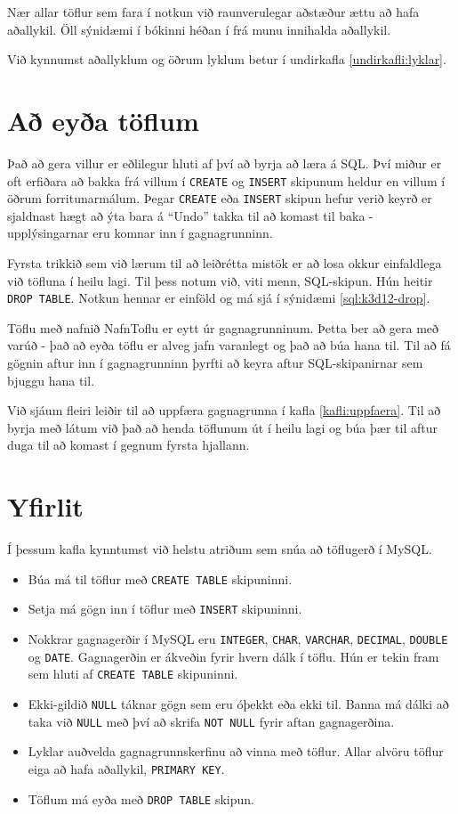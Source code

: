 Nær allar töflur sem fara í notkun við raunverulegar aðstæður ættu að hafa aðallykil. Öll sýnidæmi í bókinni héðan í frá munu innihalda aðallykil.

Við kynnumst aðallyklum og öðrum lyklum betur í undirkafla \ref{undirkafli:lyklar}.
\section{Að eyða töflum} %
Það að gera villur er eðlilegur hluti af því að byrja að læra á SQL. Því miður er oft erfiðara að bakka frá villum í \verb|CREATE| og \verb|INSERT| skipunum heldur en villum í öðrum forritunarmálum. Þegar \verb|CREATE| eða \verb|INSERT| skipun hefur verið keyrð er sjaldnast hægt að ýta bara á ``Undo'' takka til að komast til baka - upplýsingarnar eru komnar inn í gagnagrunninn.

Fyrsta trikkið sem við lærum til að leiðrétta mistök er að losa okkur einfaldlega við töfluna í heilu lagi. Til þess notum við, viti menn, SQL-skipun. Hún heitir \verb|DROP TABLE|. Notkun hennar er einföld og má sjá í sýnidæmi \ref{sql:k3d12-drop}.

\begin{example}
\caption[DROP TABLE]{Töflu með nafnið NafnToflu er eytt úr gagnagrunninum. Þetta ber að gera með varúð - það að eyða töflu er alveg jafn varanlegt og það að búa hana til. Til að fá gögnin aftur inn í gagnagrunninn þyrfti að keyra aftur SQL-skipanirnar sem bjuggu hana til.}
\label{sql:k3d12-drop}
\centering
{}
\end{example}

Við sjáum fleiri leiðir til að uppfæra gagnagrunna í kafla \ref{kafli:uppfaera}. Til að byrja með látum við það að henda töflunum út í heilu lagi og búa þær til aftur duga til að komast í gegnum fyrsta hjallann.

\section{Yfirlit}
Í þessum kafla kynntumst við helstu atriðum sem snúa að töflugerð í MySQL.

\begin{itemize}
 \item Búa má til töflur með \verb|CREATE TABLE| skipuninni.
 \item Setja má gögn inn í töflur með \verb|INSERT| skipuninni.
 \item Nokkrar gagnagerðir í MySQL eru \verb|INTEGER|, \verb|CHAR|, \verb|VARCHAR|, \verb|DECIMAL|, \verb|DOUBLE| og \verb|DATE|. Gagnagerðin er ákveðin fyrir hvern dálk í töflu. Hún er tekin fram sem hluti af \verb|CREATE TABLE| skipuninni.
 \item Ekki-gildið \verb|NULL| táknar gögn sem eru óþekkt eða ekki til. Banna má dálki að taka við \verb|NULL| með því að skrifa \verb|NOT NULL| fyrir aftan gagnagerðina.
 \item Lyklar auðvelda gagnagrunnskerfinu að vinna með töflur. Allar alvöru töflur eiga að hafa aðallykil, \verb|PRIMARY KEY|.
 \item Töflum má eyða með \verb|DROP TABLE| skipun.
\end{itemize}
